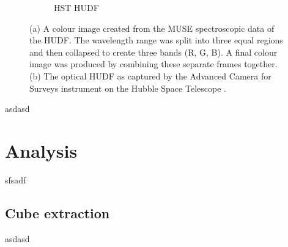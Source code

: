\documentclass[12pt, twocolumn]{revtex4}    %
\begin{document}
\begin{figure}
\begin{subfigure}[b]{0.4\textwidth}
    \captionsetup{justification=justified}    
    \caption{HST HUDF}
    \label{fig:hubble_ultra_deep_field}
  \end{subfigure}
  \captionsetup{justification=justified}
  \caption[Hubble Ultra Deep Field]{(a) A colour image created from the MUSE spectroscopic data of the HUDF. The wavelength range was split into three equal regions and then collapsed to create three bands (R, G, B). A final colour image was produced by combining these separate frames together. (b) The optical HUDF as captured by the Advanced Camera for Surveys instrument on the Hubble Space Telescope \cite{hudf_image}. }
\end{figure}

\twocolumngrid

asdasd

\section{Analysis} 

sfsadf

\subsection{Cube extraction}

asdasd

\onecolumngrid
\end{document}
